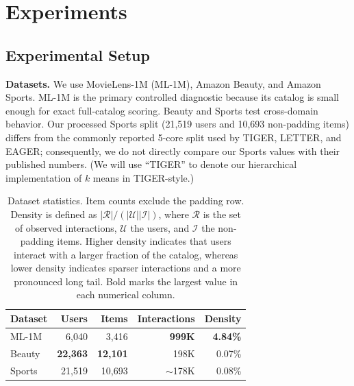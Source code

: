 \documentclass[letterpaper]{article}
\begin{document}

\section{Experiments}

\subsection{Experimental Setup}

\textbf{Datasets.}
We use MovieLens-1M (ML-1M), Amazon Beauty, and Amazon Sports. ML-1M is the primary controlled diagnostic because its catalog is small enough for exact full-catalog scoring. Beauty and Sports test cross-domain behavior. Our processed Sports split (21,519 users and 10,693 non-padding items) differs from the commonly reported 5-core split used by TIGER, LETTER, and EAGER; consequently, we do not directly compare our Sports values with their published numbers. (We will use “TIGER” to denote our hierarchical implementation of \(k\) means in TIGER-style.) 

\begin{table}[t]
\centering
\small
\begin{tabular}{lrrrr}
\toprule
Dataset & Users & Items & Interactions & Density \\
\midrule
ML-1M & 6,040 & 3,416 & \textbf{999K} & \textbf{4.84\%} \\
Beauty & \textbf{22,363} & \textbf{12,101} & 198K & 0.07\% \\
Sports & 21,519 & 10,693 & \(\sim\)178K & 0.08\% \\
\bottomrule
\end{tabular}
\caption{Dataset statistics. Item counts exclude the padding row. Density is
defined as $|\mathcal{R}|/(|\mathcal{U}||\mathcal{I}|)$, where
$\mathcal{R}$ is the set of observed interactions, $\mathcal{U}$ the users,
and $\mathcal{I}$ the non-padding items. 
Higher density indicates that users interact with a larger fraction of the
catalog, whereas lower density indicates sparser interactions and a more
pronounced long tail. Bold marks the largest value in each numerical column.}

\label{tab:data}
\end{table}
\end{document}
